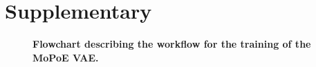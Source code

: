 \renewcommand{\thetable}{S\arabic{table}}
\setcounter{figure}{0}
\renewcommand{\thefigure}{S\arabic{figure}}

\section{Supplementary}

\begin{figure}
    \hspace*{-3.5cm}
    \label{fig:flowchart}
    \caption{\textbf{Flowchart describing the workflow for the training of the MoPoE VAE.}}

\end{figure}
